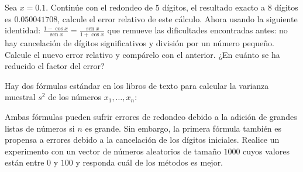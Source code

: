 \begin{questions}
    Sea $x=0.1$. Continúe con el redondeo de $5$ dígitos, el
    resultado exacto a $8$ dígitos es $0.050041708$, calcule el error
    relativo de este cálculo.
    Ahora usando la siguiente identidad:
    \begin{math}
        \frac{1-\cos x}{\operatorname{sen}x}=
        \frac{\operatorname{sen}x}{1+\cos x}
    \end{math}
    que remueve las dificultades encontradas antes: no hay
    cancelación de dígitos significativos y división por un número
    pequeño.
    Calcule el nuevo error relativo y compárelo con el anterior.
    ¿En cuánto se ha reducido el factor del error?

    \question

    Hay dos fórmulas estándar en los libros de texto para calcular la
    varianza muestral $s^{2}$ de los números $x_{1},\dotsc,x_{n}$:


    Ambas fórmulas pueden sufrir errores de redondeo debido a la
    adición de grandes listas de números si $n$ es grande.
    Sin embargo, la primera fórmula también es propensa a errores
    debido a la cancelación de los dígitos iniciales.
    Realice un experimento con un vector de números aleatorios de
    tamaño $1000$
    cuyos valores están entre $0$ y $100$ y responda cuál de los
    métodos es mejor.


\end{questions}
